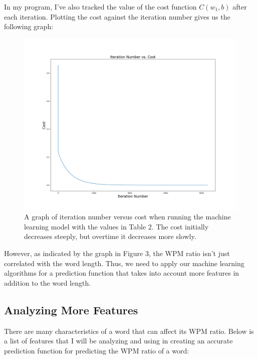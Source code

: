 \documentclass[12pt]{article}
\begin{document}
In my program, I've also tracked the value of the cost function $C(w_1, b)$ after each iteration. Plotting the cost against the iteration number gives us the following graph:
\begin{figure}[H]
	\centering
	\caption{A graph of iteration number versus cost when running the machine learning model with the values in Table 2. The cost initially decreases steeply, but overtime it decreases more slowly.}
	\includegraphics[width=\textwidth]{iteration-no-vs-cost.png}
\end{figure}

However, as indicated by the graph in Figure 3, the WPM ratio isn't just correlated with the word length. Thus, we need to apply our machine learning algorithms for a prediction function that takes into account more features in addition to the word length.

\subsection*{Analyzing More Features}

There are many characteristics of a word that can affect its WPM ratio. Below is a list of features that I will be analyzing and using in creating an accurate prediction function for predicting the WPM ratio of a word:
\end{document}
